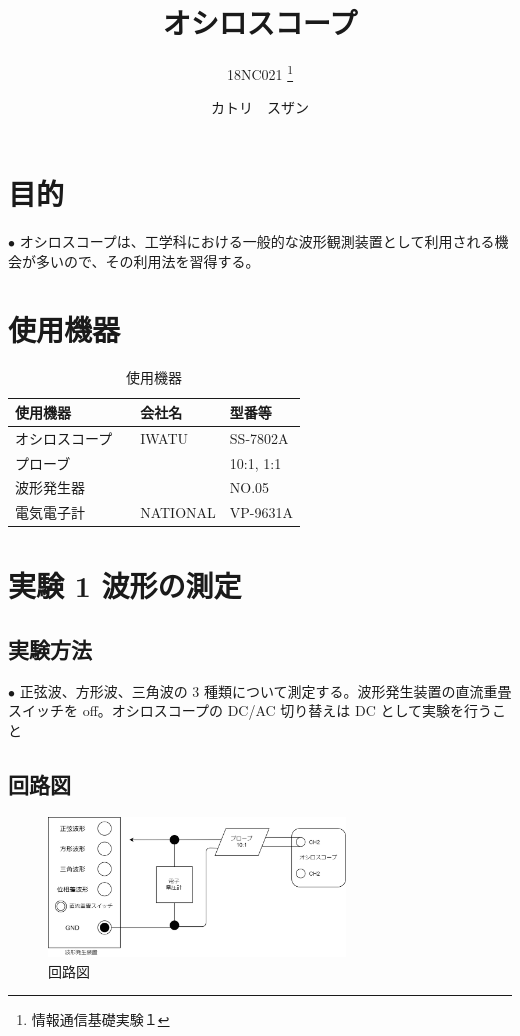 \documentclass[10pt]{article}
\title{オシロスコープ}
\author{18NC021 \thanks{情報通信基礎実験１}}
\date{カトリ　スザン}
\begin{document}
\begin{titlepage}
	\maketitle
\end{titlepage}

\tableofcontents
\pagebreak

\section{目的}
 $\bullet$ オシロスコープは、工学科における一般的な波形観測装置として利用される機会が多いので、その利用法を習得する。

\section{使用機器}

\begingroup
\setlength{\tabcolsep}{5pt} %
\renewcommand{\arraystretch}{1.5} %
\begin{table}[H]
    \centering
	\caption{使用機器}
	\begin{tabular}{|l|l|l|}
	    \hline
	    使用機器 & 会社名 & 型番等\\[0.5ex]
		\hline\hline
		オシロスコープ　&IWATU &	SS-7802A \\ \hline
		プローブ	&  &10:1, 1:1 \\ \hline
		波形発生器　　&	 &NO.05 \\ \hline
        電気電子計　& NATIONAL &	VP-9631A \\ \hline
	\end{tabular}
\end{table} 
\endgroup

\section{実験 1 波形の測定}

\subsection{実験方法}
$\bullet$ 正弦波、方形波、三角波の 3 種類について測定する。波形発生装置の直流重畳スイッチを off。オシロスコープの DC/AC 切り替えは DC として実験を行うこと

\subsection{回路図}
\begin{figure}[H]
	\centering
	\includegraphics[width=0.704\textwidth]{exp1.png}
	\caption{回路図}
\end{figure}
\end{document}

